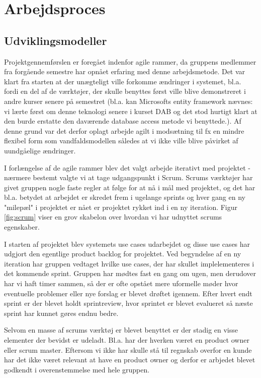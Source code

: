 \section{Arbejdsproces}

\subsection{Udviklingsmodeller}
Projektgennemførslen er foregået indenfor agile rammer, da gruppens medlemmer fra forgående semestre har opnået erfaring med denne arbejdsmetode. Det var klart fra starten at der unægteligt ville forkomme ændringer i systemet, bl.a. fordi en del af de værktøjer, der skulle benyttes først ville blive demonstreret i andre kurser senere på semestret (bl.a. kan Microsofts entity framework nævnes: vi lærte først om denne teknologi senere i kurset DAB og det stod hurtigt klart at den burde erstatte den daværende database access metode vi benyttede.). Af denne grund var det derfor oplagt arbejde agilt i modsætning til fx en mindre flexibel form som vandfaldsmodellen således at vi ikke ville blive påvirket af uundgåelige ændringer.

I forlængelse af de agile rammer blev det valgt arbejde iterativt med projektet - nærmere bestemt valgte vi at tage udgangspunkt i Scrum. Scrums værktøjer har givet gruppen nogle faste regler at følge for at nå i mål med projektet, og det har bl.a. betydet at arbejdet er skredet frem i ugelange sprints og hver gang en ny "milepæl" i projektet er nået er projektet rykket ind i en ny iteration. Figur \ref{fig:scrum} viser en grov skabelon over hvordan vi har udnyttet scrums egenskaber. 


I starten af projektet blev systemets use cases udarbejdet og disse use cases har udgjort den egentlige product backlog for projektet. Ved begyndelse af en ny iteration har gruppen vedtaget hvilke use cases, der har skullet implelementeres i det kommende sprint. Gruppen har mødtes fast en gang om ugen, men derudover har vi haft timer sammen, så der er ofte opstået mere uformelle møder hvor eventuelle problemer eller nye forslag er blevet drøftet igennem. Efter hvert endt sprint er der blevet holdt sprintreview, hvor sprintet er blevet evalueret så næste sprint har kunnet gøres endnu bedre.   

Selvom en masse af scrums værktøj er blevet benyttet er der stadig en visse elementer der bevidst er udeladt. Bl.a. har der hverken været en product owner eller scrum master.  Eftersom vi ikke har skulle stå til regnskab overfor en kunde har det ikke været relevant at have en product owner og derfor er arbjedet blevet godkendt i overenstemmelse med hele gruppen.

